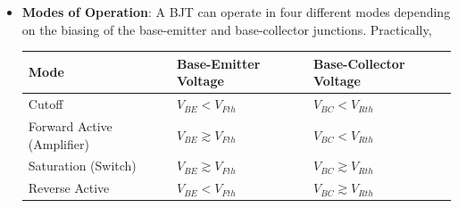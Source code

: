 \begin{itemize}
\begin{itemize}
        simplifying for forward active or reverse active mode, you get:
        \begin{itemize}
          \item \textbf{Under Forward Active Mode}:
            \begin{align*}
              V_{BE} = V_T \ln \left( \frac{I_C}{I_{S}} + 1 \right) \\
              V_{BC} \ll 0
            \end{align*}
          \item \textbf{Under Reverse Active Mode}:
            \begin{align*}
              V_{BE} \ll 0 \\
              V_{BC} = V_T \ln \left( \frac{I_C}{I_{S}} + 1 \right)
            \end{align*}
          \end{itemize}
      \item \textbf{Collector-Emitter \(V_{CE}\) Voltage}:
        The collector-emitter voltage is the voltage across the collector and
        emitter terminals. It is given by:
        \begin{align*}
          V_{CE} &= V_{BE} - V_{BC} \\
          V_{CE} &= V_B - V_E - (V_B - V_C) \\
          V_{CE} &= V_B - V_E - V_B + V_C \\
          V_{CE} &= V_C - V_E
        \end{align*}
    \end{itemize}
  \item \textbf{Modes of Operation}:
    A BJT can operate in four different modes depending on the biasing of
    the base-emitter and base-collector junctions. Practically,\\
    \begin{tabularx}{\linewidth}{|X|X|X|} \hline
      Mode & Base-Emitter Voltage & Base-Collector Voltage \\ \hline
      Cutoff         & $V_{BE} < V_{Fth} $       & $V_{BC} < V_{Rth}$       \\ \hline
      Forward Active (Amplifier) & $V_{BE} \gtrsim V_{Fth} $ & $V_{BC} < V_{Rth}$       \\ \hline
      Saturation (Switch) & $V_{BE} \gtrsim V_{Fth}$ & $V_{BC} \gtrsim V_{Rth}$ \\ \hline
      Reverse Active & $V_{BE} < V_{Fth}$       & $V_{BC} \gtrsim V_{Rth}$ \\ \hline
    \end{tabularx}

\end{itemize}
